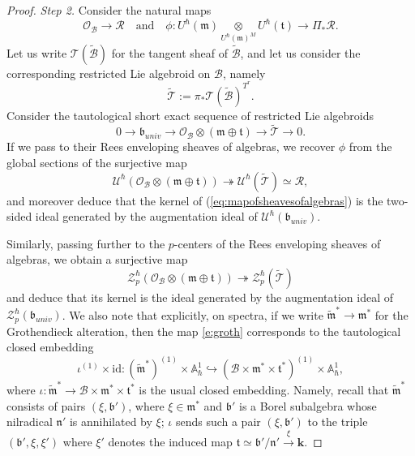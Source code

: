 \documentclass{amsart}
\theoremstyle{definition}
\newcommand{\fm}{\mathfrak{m}}
\newcommand{\fb}{\mathfrak{b}}
\newcommand{\ft}{\mathfrak{t}}
\newcommand{\OO}{\mathscr{O}}
\newcommand{\sT}{\mathscr{T}}
\newcommand{\on}{\mathrm}
\newcommand{\bk}{\mathbf{k}}
\newcommand{\wsB}{\widetilde{\mathscr{B}}}
\newcommand{\sB}{\mathscr{B}}
\numberwithin{equation}{section}
\begin{document}
\begin{proof}
{\em \noindent Step 2.} Consider the natural maps  $$\mathscr{O}_{\sB} \rightarrow \mathscr{R} \quad \text{and} \quad \phi: U^\hbar(\fm) \underset{U^\hbar(\fm)^M}\otimes  U^\hbar(\ft)  \rightarrow  \Pi_* \mathscr{R}.$$
Let us write $\sT(\wsB)$ for the tangent sheaf of $\wsB$, and let us consider the corresponding restricted Lie algebroid on $\sB$, namely $$\widetilde{\sT} := \pi_*\sT(\wsB)^{T^r}.$$ Consider the tautological short exact sequence of restricted Lie algebroids
$$0 \rightarrow \fb_{univ} \rightarrow \OO_{\sB} \otimes (\fm \oplus \ft)  \rightarrow \widetilde{\sT} \rightarrow 0.$$
If we pass to their Rees enveloping sheaves of algebras, we recover $\phi$ from the global sections of the surjective map
\begin{equation}\label{eq:mapofsheavesofalgebras} \mathscr{U}^\hbar(\OO_{\sB} \otimes (\fm \oplus \ft)) \twoheadrightarrow  \mathscr{U}^\hbar(\widetilde{\sT}) \simeq \mathscr{R},\end{equation}
and moreover deduce that the kernel of (\ref{eq:mapofsheavesofalgebras}) is the two-sided ideal generated by the augmentation ideal of $\mathscr{U}^\hbar(\fb_{univ})$. 

Similarly, passing further to the $p$-centers of the Rees enveloping sheaves of algebras, we obtain a surjective map 
\begin{equation} \label{e:groth}\mathscr{Z}^\hbar_p(\OO_{\sB} \otimes (\fm \oplus \ft)) \twoheadrightarrow \mathscr{Z}^\hbar_p(\widetilde{\sT})\end{equation}
and deduce that its kernel is the ideal generated by the augmentation ideal of $\mathscr{Z}^\hbar_p(\fb_{univ})$. We also note that explicitly, on spectra, if we write $\widetilde{\fm}^* \rightarrow \fm^*$ for the Grothendieck alteration, then the map \eqref{e:groth} corresponds to the tautological closed embedding 
\begin{equation} \label{e:groth2}  \iota^{(1)} \times \on{id}: (\widetilde{\fm}^*)^{(1)} \times \mathbb{A}^1_\hbar \hookrightarrow  (\sB \times \fm^* \times \ft^*)^{(1)} \times \mathbb{A}^1_\hbar,\end{equation}
where $\iota: \widetilde{\fm}^* \rightarrow \sB \times \fm^* \times \ft^*$ is the usual closed embedding. Namely, recall that $\widetilde{\fm}^*$ consists of pairs $(\xi, \fb')$, where $\xi \in \fm^*$ and $\fb'$ is a Borel subalgebra whose nilradical $\mathfrak{n}'$ is annihilated by $\xi$; $\iota$ sends such a pair $(\xi, \fb')$ to the triple $(\fb', \xi, \xi')$ where $\xi'$ denotes the induced map $\ft \simeq \fb'/\mathfrak{n}' \xrightarrow{\xi} \bk.$ 


\end{proof}
\end{document}
